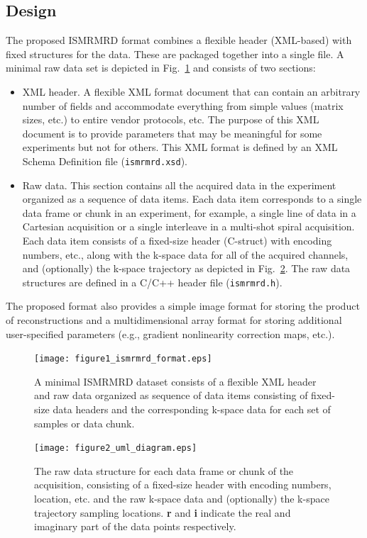 \documentclass[12pt, draft]{article}
\begin{document}
\subsection*{Design}
The proposed ISMRMRD format combines a flexible header (XML-based) with fixed structures for the data. These are packaged together into a single file.  A minimal raw data set is depicted in Fig.~\ref{fig:format} and consists of two sections:
\begin{itemize}
\item{XML header.} A flexible XML format document that can contain an arbitrary number of fields and accommodate everything from simple values (matrix sizes, etc.) to entire vendor protocols, etc. The purpose of this XML document is to provide parameters that may be meaningful for some experiments but not for others. This XML format is defined by an XML Schema Definition file (\texttt{ismrmrd.xsd}).
\item{Raw data.} This section contains all the acquired data in the experiment organized as a sequence of data items.  Each data item corresponds to a single data frame or chunk in an experiment, for example, a single line of data in a Cartesian acquisition or a single interleave in a multi-shot spiral acquisition. Each data item consists of a fixed-size header (C-struct) with encoding numbers, etc., along with the k-space data for all of the acquired channels, and (optionally) the k-space trajectory as depicted in Fig.~\ref{fig:cstruct}. The raw data structures are defined in a C/C++ header file (\texttt{ismrmrd.h}).
\end{itemize}
The proposed format also provides a simple image format for storing the product of reconstructions and a multidimensional array format for storing additional user-specified parameters (e.g., gradient nonlinearity correction maps, etc.).

\begin{figure}
\begin{center}
\texttt{[image: figure1\_ismrmrd\_format.eps]}
\caption{A minimal ISMRMRD dataset consists of a flexible XML header and raw data organized as sequence of data items consisting of fixed-size data headers and the corresponding k-space data for each set of samples or data chunk.}
\label{fig:format}
\end{center}
\end{figure}

\begin{figure}
\begin{center}
\texttt{[image: figure2\_uml\_diagram.eps]}
\caption{The raw data structure for each data frame or chunk of the acquisition, consisting of a fixed-size header with encoding numbers, location, etc. and the raw k-space data and (optionally) the k-space trajectory sampling locations. \textbf{r} and \textbf{i} indicate the real and imaginary part of the data points respectively.}
\label{fig:cstruct}
\end{center}
\end{figure}
\end{document}

